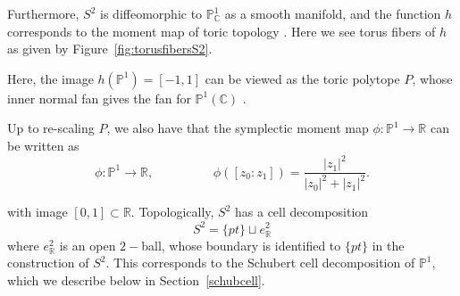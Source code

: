 \documentclass{amsart}
\newcommand{\R}{\mathbb{R}}
\newcommand{\PP}{\mathbb{P}}\newcommand{\A}{\mathbb{A}}\newcommand{\Z}{\mathbb{Z}}\newcommand{\C}{\mathbb{C}}\newcommand{\N}{\mathbb{N}}\newcommand{\T}{\mathbb{T}}
\begin{document}
Furthermore, $S^2$ is diffeomorphic to $\PP^1_\C$ as a smooth manifold, and the function $h$ corresponds to the moment map of toric topology \cite{C-L-S}. Here we see torus fibers of $h$ as given by Figure~\ref{fig:torusfibersS2}. 

Here, the image $h(\PP^1) = [-1,1]$ can be viewed as the toric polytope $P$, whose inner normal fan gives the fan for $\PP^1(\C)$ \cite{C-L-S}.

Up to re-scaling $P$, we also have that the symplectic moment map $\phi: \PP^1 \rightarrow \R$ can be written as \[ \phi: \PP^1\rightarrow \R, \hspace{2cm} \phi([z_0:z_1]) = \frac{ |z_1|^2}{|z_0|^2+|z_1|^2}. \]

with image $[0,1] \subset \R$. %
Topologically, $S^2$ has a cell decomposition \[ S^2 = \{pt \} \sqcup e^2_\R \] where $e^2_\R$ is an open $2-$ball, whose boundary is identified to $\{pt\}$ in the construction of $S^2$. This corresponds to the Schubert cell decomposition of $\PP^1$, which we describe below in Section~\ref{schubcell}. 
\end{document}
